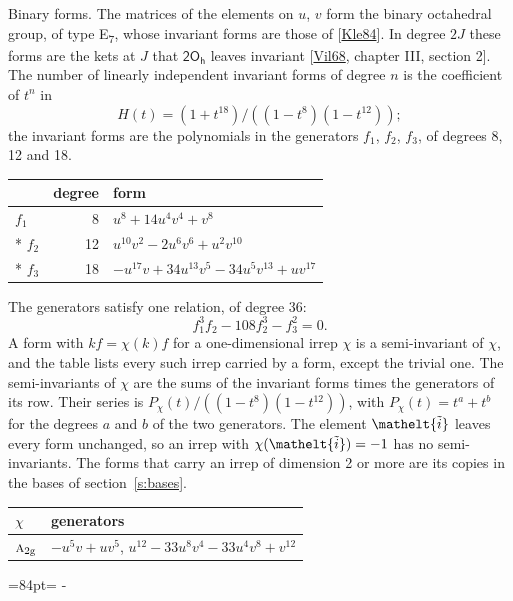 \documentclass[10pt,a4paper]{article}
\makeatletter
\renewcommand\paragraph{\@startsection{paragraph}{4}{\z@}{1.5ex plus .5ex minus .2ex}{-1em}%
  {\normalfont\small\sffamily\bfseries\color{parttitle}}}
\newcommand{\needspace}[1]{\par\penalty-100\begingroup\dimen0=#1\relax\dimen2=\pagegoal
  \advance\dimen2-\pagetotal\ifdim\dimen0>\dimen2\relax\ifdim\dimen2>0pt\vfil\break\fi\fi
  \endgroup}
\numberwithin{equation}{section}
\newcommand{\eltfont}[1]{{\let\sigma\eltsigma\mathelt{#1}}}
\newcommand{\grp}[1]{\mathsf{#1}}
\newcommand{\irr}[1]{\text{\normalfont\scshape #1}}
\newcommand{\elt}[1]{\eltfont{#1}}
\newcommand{\ptag}[1]{\mathrm{#1}}
\newcommand{\lift}[1]{\tilde{#1}}
\makeatother
\begin{document}
\paragraph{Binary forms.}
The matrices of the elements on $u$, $v$ form the binary octahedral group, of type E\textsubscript{7}, whose invariant forms are those of [\href{../../../REFERENCES.pdf\#ref.Kle84}{Kle84}]. In degree $2J$ these forms are the kets at $J$ that $\grp{2O_{h}}$ leaves invariant [\href{../../../REFERENCES.pdf\#ref.Vil68}{Vil68}, chapter III, section 2]. \label{n:head.degree}\label{n:head.form}The number of linearly independent invariant forms of degree $n$ is the coefficient of $t^n$ in
\begin{equation}\label{e:molien}H(t) = (1 + t^{18})/((1-t^{8})(1-t^{12}));\end{equation}
the invariant forms are the polynomials in the generators $f_1$, $f_2$, $f_3$, of degrees 8, 12 and 18.
{\small\begin{longtable}{@{}lrl@{}}\toprule
& degree & form\\\midrule\endhead
\bottomrule\endfoot\endlastfoot
$f_{1}$ & 8 & $u^{8} + 14u^{4}v^{4} + v^{8}$\\*
$f_{2}$ & 12 & $u^{10}v^{2} - 2u^{6}v^{6} + u^{2}v^{10}$\\*
$f_{3}$ & 18 & $-u^{17}v + 34u^{13}v^{5} - 34u^{5}v^{13} + uv^{17}$\\
\bottomrule\end{longtable}}
The generators satisfy one relation, of degree 36:
\begin{equation}\label{e:relation}f_{1}^{3}f_{2} - 108f_{2}^{3} - f_{3}^{2} = 0.\end{equation}
A form with $k f = \chi(k) f$ for a one-dimensional irrep $\chi$ is a semi-invariant of $\chi$, and the table lists every such irrep carried by a form, except the trivial one. \label{n:head.generators}The semi-invariants of $\chi$ are the sums of the invariant forms times the generators of its row. Their series is $P_\chi(t)/((1-t^{8})(1-t^{12}))$, with $P_\chi(t) = t^{a} + t^{b}$ for the degrees $a$ and $b$ of the two generators. The element $\elt{\lift{i}}$ leaves every form unchanged, so an irrep with $\chi(\elt{\lift{i}}) = -1$ has no semi-invariants. The forms that carry an irrep of dimension 2 or more are its copies in the bases of section~\ref{s:bases}.
{\small\begin{longtable}{@{}ll@{}}\toprule
$\chi$ & generators\\\midrule\endhead
\bottomrule\endfoot\endlastfoot
$\irr{a}_{2\ptag{g}}$ & $-u^{5}v + uv^{5}$, $u^{12} - 33u^{8}v^{4} - 33u^{4}v^{8} + v^{12}$\\
\bottomrule\end{longtable}}
\needspace{84pt}
\end{document}
